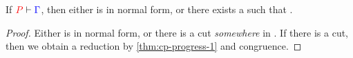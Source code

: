 \begin{theorem}[Progress, NF]\label{thm:cp-progress-2}
  If $\seq[{ P }]{ \Gamma }$, then either  is in normal form, or there
  exists a  such that .
\end{theorem}
\begin{proof}
  Either  is in normal form, or there is a cut \emph{somewhere} in .
  If there is a cut, then we obtain a reduction by \cref{thm:cp-progress-1} and
  congruence.
\end{proof}
 